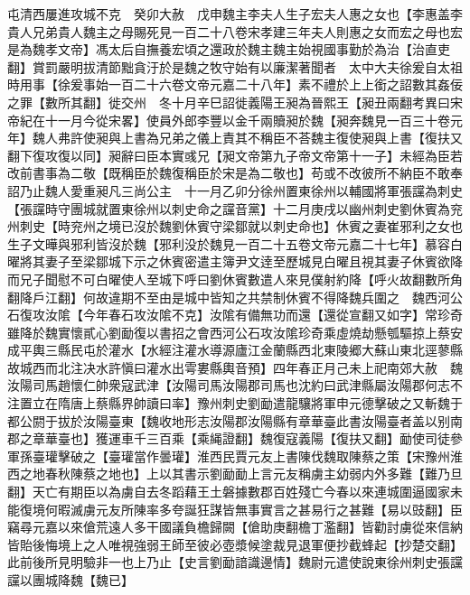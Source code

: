 屯清西屢進攻城不克　癸卯大赦　戊申魏主李夫人生子宏夫人惠之女也【李惠盖李貴人兄弟貴人魏主之母賜死見一百二十八卷宋孝建三年夫人則惠之女而宏之母也宏是為魏孝文帝】馮太后自撫養宏頃之還政於魏主魏主始視國事勤於為治【治直吏翻】賞罰嚴明拔清節黜貪汙於是魏之牧守始有以廉潔著聞者　太中大夫徐爰自太祖時用事【徐爰事始一百二十六卷文帝元嘉二十八年】素不禮於上上銜之詔數其姦佞之罪【數所其翻】徙交州　冬十月辛巳詔徙義陽王昶為晉熙王【昶丑兩翻考異曰宋帝紀在十一月今從宋畧】使員外郎李豐以金千兩贖昶於魏【昶奔魏見一百三十卷元年】魏人弗許使昶與上書為兄弟之儀上責其不稱臣不荅魏主復使昶與上書【復扶又翻下復攻復以同】昶辭曰臣本實彧兄【昶文帝第九子帝文帝第十一子】未經為臣若改前書事為二敬【既稱臣於魏復稱臣於宋是為二敬也】苟或不改彼所不納臣不敢奉詔乃止魏人愛重昶凡三尚公主　十一月乙卯分徐州置東徐州以輔國將軍張讜為刺史【張讜時守團城就置東徐州以刺史命之讜音黨】十二月庚戌以幽州刺史劉休賓為兖州刺史【時兖州之境已沒於魏劉休賓守梁鄒就以刺史命也】休賓之妻崔邪利之女也生子文曄與邪利皆沒於魏【邪利没於魏見一百二十五卷文帝元嘉二十七年】慕容白曜將其妻子至梁鄒城下示之休賓密遣主簿尹文逹至歷城見白曜且視其妻子休賓欲降而兄子聞慰不可白曜使人至城下呼曰劉休賓數遣人來見僕射約降【呼火故翻數所角翻降戶江翻】何故違期不至由是城中皆知之共禁制休賓不得降魏兵圍之　魏西河公石復攻汝隂【今年春石攻汝隂不克】汝隂有備無功而還【還從宣翻又如字】常珍奇雖降於魏實懷貳心劉勔復以書招之會西河公石攻汝隂珍奇乘虛燒劫懸瓠驅掠上蔡安成平輿三縣民屯於灌水【水經注灌水導源廬江金蘭縣西北東陵郷大蘇山東北逕蓼縣故城西而北注决水許愼曰灌水出雩婁縣輿音預】四年春正月己未上祀南郊大赦　魏汝陽司馬趙懷仁帥衆寇武津【汝陽司馬汝陽郡司馬也沈約曰武津縣屬汝陽郡何志不注置立在隋唐上蔡縣界帥讀曰率】豫州刺史劉勔遣龍驤將軍申元德擊破之又斬魏于都公閼于拔於汝陽臺東【魏收地形志汝陽郡汝陽縣有章華臺此書汝陽臺者盖以别南郡之章華臺也】獲運車千三百乘【乘䋲證翻】魏復寇義陽【復扶又翻】勔使司徒參軍孫臺瓘擊破之【臺瓘當作曇瓘】淮西民賈元友上書陳伐魏取陳蔡之策【宋豫州淮西之地春秋陳蔡之地也】上以其書示劉勔勔上言元友稱虜主幼弱内外多難【難乃旦翻】天亡有期臣以為虜自去冬蹈藉王土磐據數郡百姓殘亡今春以來連城圍逼國家未能復境何暇滅虜元友所陳率多夸誕狂謀皆無事實言之甚易行之甚難【易以豉翻】臣竊尋元嘉以來傖荒遠人多干國議負檐歸闕【傖助庚翻檐丁濫翻】皆勸討虜從來信納皆貽後悔境上之人唯視強弱王師至彼必壺漿候塗裁見退軍便抄截蜂起【抄楚交翻】此前後所見明驗非一也上乃止【史言劉勔諳識邊情】魏尉元遣使說東徐州刺史張讜讜以團城降魏【魏已】

